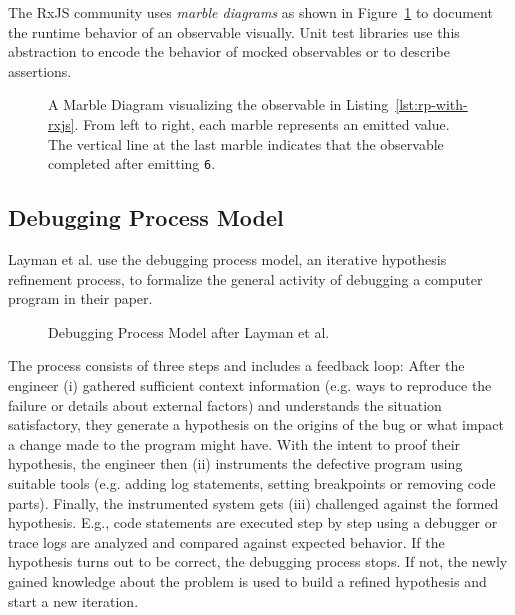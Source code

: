 \documentclass[sigplan,screen]{acmart}
\begin{document}
The RxJS community uses \emph{marble diagrams} as shown in Figure~\ref{fig:marble-diagram} to document \cite{marblediagrams} the runtime behavior of an observable visually. Unit test libraries\cite{marbletesting} use this abstraction to encode the behavior of mocked observables or to describe assertions.

\begin{figure}
	\centering
	\caption{A Marble Diagram visualizing the observable in Listing~\ref{lst:rp-with-rxjs}. From left to right, each marble represents an emitted value. The vertical line at the last marble indicates that the observable completed after emitting \texttt{6}.}
	\label{fig:marble-diagram}
\end{figure}

\subsection{Debugging Process Model}

Layman et al. \cite{Layman_Diep_Nagappan_Singer_Deline_Venolia_2013} use the debugging process model, an iterative hypothesis refinement process, to formalize the general activity of debugging a computer program in their paper.

\begin{figure}
	\centering
	\caption{Debugging Process Model after Layman et al. \cite{Layman_Diep_Nagappan_Singer_Deline_Venolia_2013}}
	\label{fig:debugging-process-model}
\end{figure}

The process consists of three steps and includes a feedback loop: After the engineer (i) gathered sufficient context information (e.g. ways to reproduce the failure or details about external factors) and understands the situation satisfactory, they generate a hypothesis on the origins of the bug or what impact a change made to the program might have. With the intent to proof their hypothesis, the engineer then (ii) instruments the defective program using suitable tools (e.g. adding log statements, setting breakpoints or removing code parts). Finally, the instrumented system gets (iii) challenged against the formed hypothesis. E.g., code statements are executed step by step using a debugger or trace logs are analyzed and compared against expected behavior. If the hypothesis turns out to be correct, the debugging process stops. If not, the newly gained knowledge about the problem is used to build a refined hypothesis and start a new iteration.
\end{document}

